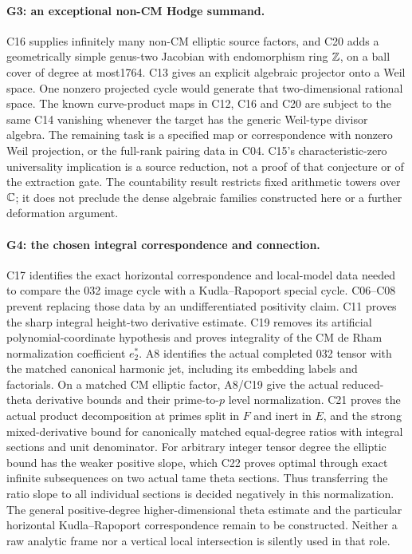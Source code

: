 \documentclass[11pt]{article}
\theoremstyle{definition}\newtheorem{definition}[theorem]{Definition}\newtheorem{remark}[theorem]{Remark}
\begin{document}
\paragraph{G3: an exceptional non-CM Hodge summand.}
C16 supplies infinitely many non-CM elliptic source factors, and
C20 adds a geometrically simple genus-two Jacobian with
endomorphism ring $\mathbb Z$, on a ball cover of degree at most1764.
C13 gives
an explicit algebraic projector onto a Weil space. One nonzero
projected cycle would generate that two-dimensional rational space.
The known curve-product maps in C12, C16 and C20 are subject to the
same C14 vanishing whenever the target has the generic Weil-type
divisor algebra. The remaining task is a specified map or correspondence
with nonzero Weil projection, or the full-rank pairing data in C04.
C15's characteristic-zero universality implication is a source
reduction, not a proof of that conjecture or of the extraction gate.
The countability result restricts fixed arithmetic towers over
$\mathbb C$; it does not preclude the dense algebraic families constructed
here or a further deformation argument.

\paragraph{G4: the chosen integral correspondence and connection.}
C17 identifies the exact horizontal correspondence and local-model
data needed to compare the 032 image cycle with a Kudla--Rapoport
special cycle. C06--C08 prevent replacing those data by an
undifferentiated positivity claim. C11 proves the sharp integral
height-two derivative estimate. C19 removes its artificial
polynomial-coordinate hypothesis and proves integrality of the
CM de Rham normalization coefficient $e_2^*$.
A8 identifies the actual completed 032 tensor with the matched
canonical harmonic jet, including its embedding labels and
factorials. On a matched CM elliptic factor, A8/C19 give the
actual reduced-theta derivative bounds and their prime-to-$p$
level normalization. C21 proves the actual product decomposition
at primes split in $F$ and inert in $E$, and the strong
mixed-derivative bound for canonically matched equal-degree
ratios with integral sections and unit denominator.
For arbitrary integer tensor degree the elliptic bound has
the weaker positive slope, which C22 proves optimal through
exact infinite subsequences on two actual tame theta sections.
Thus transferring the ratio slope to all individual sections
is decided negatively in this normalization.
The general positive-degree higher-dimensional theta estimate
and the particular horizontal Kudla--Rapoport correspondence
remain to be constructed. Neither a raw analytic
frame nor a vertical local intersection is silently used in
that role.
\end{document}
